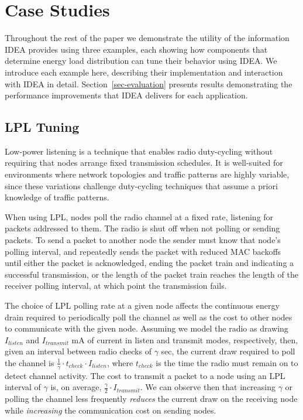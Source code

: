 \section{Case Studies}
\label{sec-casestudies}

Throughout the rest of the paper we demonstrate the utility of the
information IDEA provides using three examples, each showing how components
that determine energy load distribution can tune their behavior using IDEA.
We introduce each example here, describing their implementation and
interaction with IDEA in detail. Section~\ref{sec-evaluation} presents
results demonstrating the performance improvements that IDEA delivers for
each application.

\subsection{LPL Tuning}
\label{subsec-lpltuning}

Low-power listening is a technique that enables radio duty-cycling without
requiring that nodes arrange fixed transmission schedules. It is well-suited
for environments where network topologies and traffic patterns are
highly variable, since these variations challenge duty-cycling techniques
that assume a priori knowledge of traffic patterns.

When using LPL, nodes poll the radio channel at a fixed rate, listening for
packets addressed to them. The radio is shut off when not polling or
sending packets. To send a packet to another node the sender must know that
node's polling interval, and repeatedly sends the packet with reduced MAC
backoffs until either the packet is acknowledged, ending the packet train and
indicating a successful transmission, or the length of the packet train
reaches the length of the receiver polling interval, at which point the
transmission fails.

The choice of LPL polling rate at a given node affects the continuous energy
drain required to periodically poll the channel as well as the cost to other
nodes to communicate with the given node. Assuming we model the radio as
drawing $I_{listen}$ and $I_{transmit}$ mA of current in listen and transmit
modes, respectively, then, given an interval between radio checks of $\gamma$
sec, the current draw required to poll the channel is $\frac{1}{\gamma} \cdot
t_{check} \cdot I_{listen}$, where $t_{check}$ is the time the radio must
remain on to detect channel activity. The cost to transmit a packet to a node
using an LPL interval of $\gamma$ is, on average, $\frac{\gamma}{2} \cdot
I_{transmit}$. We can observe then that increasing $\gamma$ or polling the
channel less frequently \textit{reduces} the current draw on the receiving
node while \textit{increasing} the communication cost on sending nodes.

